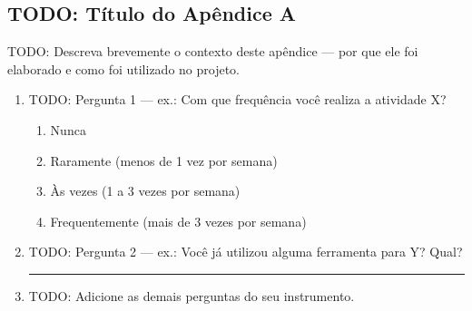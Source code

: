 %
%

\begin{apendicesenv}

\partapendices


\chapter{TODO: Título do Apêndice A}
\label{ap:questionario}

TODO: Descreva brevemente o contexto deste apêndice — por que ele
foi elaborado e como foi utilizado no projeto.

\begin{enumerate}
  \item TODO: Pergunta 1 — ex.: Com que frequência você realiza a
        atividade X?
        \begin{enumerate}[label=(\alph*)]
          \item Nunca
          \item Raramente (menos de 1 vez por semana)
          \item Às vezes (1 a 3 vezes por semana)
          \item Frequentemente (mais de 3 vezes por semana)
        \end{enumerate}

  \item TODO: Pergunta 2 — ex.: Você já utilizou alguma ferramenta
        para Y? Qual?

        \noindent\rule{\textwidth}{0.4pt} %

  \item TODO: Adicione as demais perguntas do seu instrumento.
\end{enumerate}


%


\end{apendicesenv}
